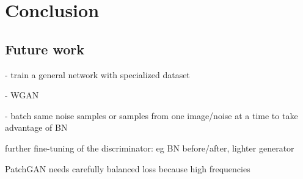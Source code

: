 \chapter{Conclusion}
\section{Future work}

- train a general network with specialized dataset

- WGAN

- batch same noise samples or samples from one image/noise at a time to take advantage of BN

further fine-tuning of the discriminator: eg BN before/after, lighter generator

PatchGAN needs carefully balanced loss because high frequencies
